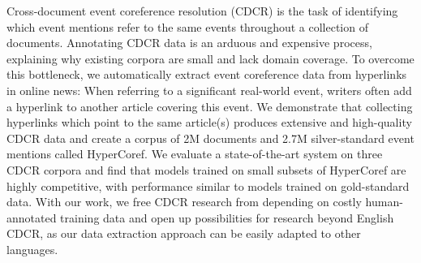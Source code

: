Cross-document event coreference resolution (CDCR) is the task of identifying which event mentions refer to the same events throughout a collection of documents. Annotating CDCR data is an arduous and expensive process, explaining why existing corpora are small and lack domain coverage. To overcome this bottleneck, we automatically extract event coreference data from hyperlinks in online news: When referring to a significant real-world event, writers often add a hyperlink to another article covering this event. We demonstrate that collecting hyperlinks which point to the same article(s) produces extensive and high-quality CDCR data and create a corpus of 2M documents and 2.7M silver-standard event mentions called HyperCoref. We evaluate a state-of-the-art system on three CDCR corpora and find that models trained on small subsets of HyperCoref are highly competitive, with performance similar to models trained on gold-standard data. With our work, we free CDCR research from depending on costly human-annotated training data and open up possibilities for research beyond English CDCR, as our data extraction approach can be easily adapted to other languages.
